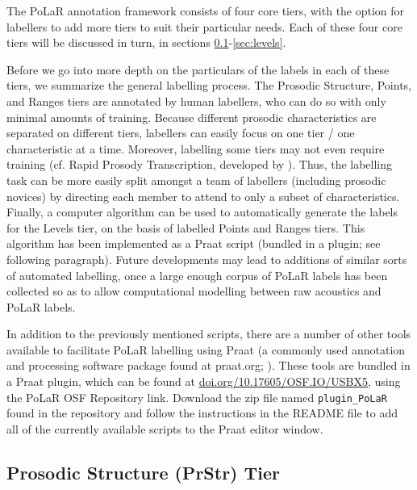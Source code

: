 \documentclass[11pt, twoside]{memoir}
\begin{document}
The PoLaR annotation framework consists of four core tiers, with the option for labellers to add more tiers to suit their particular needs. Each of these four core tiers will be discussed in turn, in sections \ref{sec:prosodic-structure-prstr}-\ref{sec:levels}.

Before we go into more depth on the particulars of the labels in each of these tiers, we summarize the general labelling process. The Prosodic Structure, Points, and Ranges tiers are annotated by human labellers, who can do so with only minimal amounts of training. Because different prosodic characteristics are separated on different tiers, labellers can easily focus on one tier / one characteristic at a time. Moreover, labelling some tiers may not even require training (cf. Rapid Prosody Transcription, developed by \citealt{cole-14}). Thus, the labelling task can be more easily split amongst a team of labellers (including prosodic novices) by directing each member to attend to only a subset of characteristics. Finally, a computer algorithm can be used to automatically generate the labels for the Levels tier, on the basis of labelled Points and Ranges tiers. This algorithm has been implemented as a Praat script (bundled in a plugin; see following paragraph). Future developments may lead to additions of similar sorts of automated labelling, once a large enough corpus of PoLaR labels has been collected so as to allow computational modelling between raw acoustics and PoLaR labels.

In addition to the previously mentioned scripts, there are a number of other tools available to facilitate PoLaR labelling using Praat (a commonly used annotation and processing software package found at praat.org; \citealt{praat}). These tools are bundled in a Praat plugin, which can be found at \href{https://doi.org/10.17605/OSF.IO/USBX5}{\uline{doi.org/10.17605/OSF.IO/USBX5}}, using the PoLaR OSF Repository link. Download the zip file named \texttt{plugin\_PoLaR} found in the repository and follow the instructions in the README file to add all of the currently available scripts to the Praat editor window.

\subsection{Prosodic Structure (PrStr) Tier}\label{sec:prosodic-structure-prstr}
\end{document}
